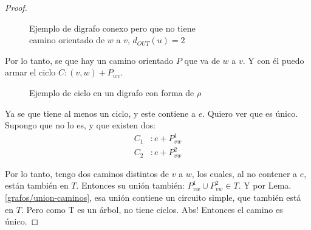 \documentclass[12pt, a4paper]{report}
\theoremstyle{definition} %
\begin{document}
\begin{enumerate}[a)]
\begin{proof}
\begin{itemize}
        \begin{figure}[H]
            \centering
            \caption*{Ejemplo de digrafo conexo pero que no tiene\\ camino orientado de $w$ a $v$, $d_{OUT}(u) = 2$}
        \end{figure}

        Por lo tanto, se que hay un camino orientado $P$ que va de $w$ a $v$. Y con él puedo armar el ciclo $C: (v, w) + P_{wv}$.

        \begin{figure}[H]
            \centering
            \caption*{Ejemplo de ciclo en un digrafo con forma de $\rho$}
        \end{figure}
    \end{itemize}

    Ya se que tiene al menos un ciclo, y este contiene a $e$. Quiero ver que es único. Supongo que no lo es, y que existen dos:
    \begin{align*}
        C_1 &: e + P^1_{vw}\\
        C_2 &: e + P^2_{vw}
    \end{align*}

    Por lo tanto, tengo dos caminos distintos de $v$ a $w$, los cuales, al no contener a $e$, están también en $T$. Entonces su unión también: $P^1_{vw} \cup P^2_{vw} \in T$. Y por Lema. \ref{grafos/union-caminos}, esa unión contiene un circuito simple, que también está en $T$. Pero como T es un árbol, no tiene ciclos. Abs! Entonces el camino es único.


\end{proof}
\end{enumerate}
\end{document}
